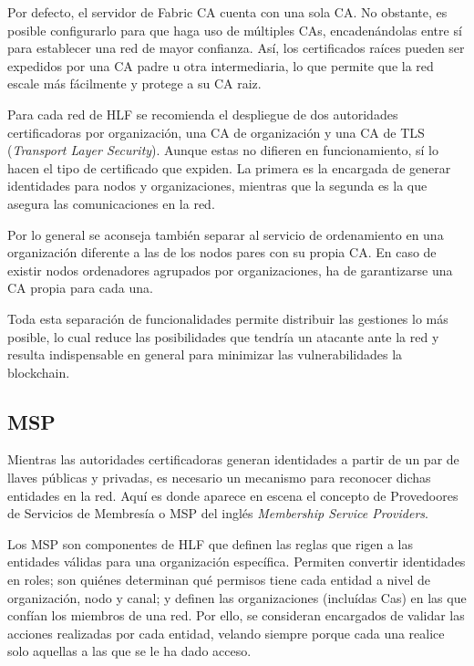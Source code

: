 Por defecto, el servidor de Fabric CA cuenta con una sola CA. No obstante, es posible configurarlo para que haga uso de m\'ultiples CAs, encaden\'andolas entre s\'i para establecer una red de mayor confianza. As\'i, los certificados ra\'ices pueden ser expedidos por una CA padre u otra intermediaria, lo que permite que la red escale m\'as f\'acilmente y protege a su CA raiz.%

Para cada red de HLF se recomienda el despliegue de dos autoridades certificadoras por organizaci\'on, una CA de organizaci\'on y una CA de TLS (\emph{Transport Layer Security}). Aunque estas no difieren en funcionamiento, s\'i lo hacen el tipo de certificado que expiden. La primera es la encargada de generar identidades para nodos y organizaciones, mientras que la segunda es la que asegura las comunicaciones en la red.

Por lo general se aconseja tambi\'en separar al servicio de ordenamiento en una organizaci\'on diferente a las de los nodos pares con su propia CA. En caso de existir nodos ordenadores agrupados por organizaciones, ha de garantizarse una CA propia para cada una.

Toda esta separaci\'on de funcionalidades permite distribuir las gestiones lo m\'as posible, lo cual reduce las posibilidades que tendr\'ia un atacante ante la red y resulta indispensable en general para minimizar las vulnerabilidades la blockchain.


\subsection{MSP}
Mientras las autoridades certificadoras generan identidades a partir de un par de llaves p\'ublicas y privadas, es necesario un mecanismo para reconocer dichas entidades en la red. Aqu\'i es donde aparece en escena el concepto de Provedoores de Servicios de Membres\'ia o MSP del ingl\'es \emph{Membership Service Providers}.

Los MSP son componentes de HLF que definen las reglas que rigen a las entidades v\'alidas para una organizaci\'on espec\'ifica. Permiten convertir identidades en roles; son qui\'enes determinan qu\'e permisos tiene cada entidad a nivel de organizaci\'on, nodo y canal; y definen las organizaciones (inclu\'idas Cas) en las que conf\'ian los miembros de una red. Por ello, se consideran encargados de validar las acciones realizadas por cada entidad, velando siempre porque cada una realice solo aquellas a las que se le ha dado acceso.

